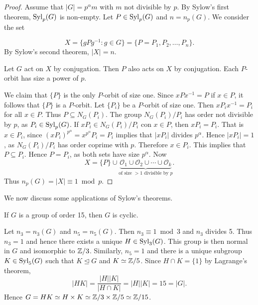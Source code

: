 \begin{proof}
    Assume that $|G|=p^{\alpha}m$ with $m$ not divisible by $p$.
    By Sylow's first theorem, $\mathrm{Syl}_p(G)$ is non-empty. Let $P\in\mathrm{Syl}_p(G)$ and $n=n_p(G)$. We consider the set  
    
        \[
        X=\{gPg^{-1}:g\in G\}=\{P=P_1,P_2,\dots,P_n\}.
        \]
    By Sylow's second theorem, $|X|=n$.

    Let $G$ act on $X$ by conjugation. Then $P$ also acts on 
    $X$ by conjugation. Each $P$-orbit has size a power of $p$. 
    
    We claim that $\{P\}$ is the only $P$-orbit of size one.  
    Since $xPx^{-1}=P$ if $x\in P$, it follows that
    $\{P\}$ is a $P$-orbit. Let $\{P_i\}$ be a $P$-orbit
    of size one. Then 
        $xP_ix^{-1}=P_i$ for all 
        $x\in P$. Thus $P\subseteq N_G(P_i)$. The group 
        $N_G(P_i)/P_i$ has order not divisible by $p$, as $P_i\in\mathrm{Syl}_p(G)$.
        If $xP_i\in N_G(P_i)/P_i$ con $x\in P$, then $xP_i=P_i$. That is
        $x\in P_i$, since 
        $(xP_i)^{p^{\alpha}}=x^{p^{\alpha}}P_i=P_i$ implies that 
        $|xP_i|$ divides $p^{\alpha}$. Hence $|xP_i|=1$,
        as $N_G(P_i)/P_i$ has order coprime with $p$. Therefore 
        $x\in P_i$.
        This implies that 
        $P\subseteq P_i$. Hence $P=P_i$, as both sets 
        have size $p^{\alpha}$. Now 
        \[
        X=\{P\}\cup \underbrace{\mathcal{O}_1\cup\mathcal{O}_2\cup\cdots\cup\mathcal{O}_k}_{\text{of size $>1$ divisible by $p$}}.
        \]
        Thus $n_p(G)=|X|\equiv 1\bmod p$.
\end{proof}

We now discuss some applications of Sylow's theorems. 

\begin{example}
If $G$ is a group of order 15, then $G$ is cyclic.

Let $n_3=n_3(G)$ and $n_5=n_5(G)$. Then $n_3\equiv1\bmod 3$ and $n_3$ divides 5. Thus $n_3=1$ and hence there exists a unique
$H\in\mathrm{Syl}_3(G)$. This group is then normal in $G$ and isomorphic to
$\mathbb{Z}/3$. Similarly, 
 $n_5=1$ and there is a unique subgroup $K\in\mathrm{Syl}_5(G)$ such that
 $K\unlhd G$ and $K\simeq\mathbb{Z}/5$. Since $H\cap K=\{1\}$ by Lagrange's theorem, 
 \[
|HK|=\frac{|H||K|}{|H\cap K|}=|H||K|=15=|G|.
\]
Hence $G=HK\simeq H\times K\simeq \mathbb{Z}/3\times\mathbb{Z}/5\simeq\mathbb{Z}/15$.
\end{example}

